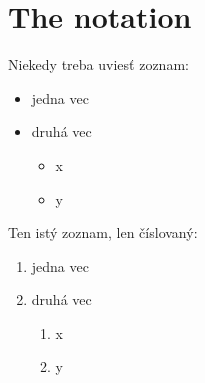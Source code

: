 \documentclass[10pt,twoside,slovak,a4paper]{article}
\begin{document}
\begin{figure*}[tbh]
\centering
\end{figure*}



\section{The notation} \label{notation}





Niekedy treba uviesť zoznam:

\begin{itemize}
\item jedna vec
\item druhá vec
	\begin{itemize}
	\item x
	\item y
	\end{itemize}
\end{itemize}

Ten istý zoznam, len číslovaný:

\begin{enumerate}
\item jedna vec
\item druhá vec
	\begin{enumerate}
	\item x
	\item y
	\end{enumerate}
\end{enumerate}
\end{document}
